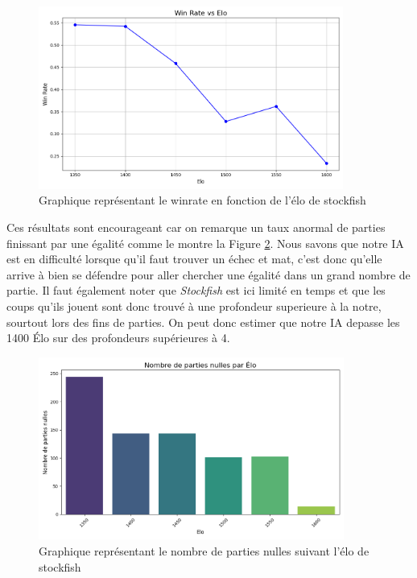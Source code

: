 \documentclass{article}
\begin{document}
\begin{figure}[h]
    \centering
    \includegraphics[width=\textwidth,height=6.0cm,keepaspectratio]{winRateCmp.png}
    \caption{Graphique représentant le winrate en fonction de l'élo de stockfish}
    \label{winRateCmp}
\end{figure}
\FloatBarrier

Ces résultats sont encourageant car on remarque un taux anormal de parties finissant par une égalité comme le montre la Figure \ref{drawCountCmp}. Nous savons que notre IA
est en difficulté lorsque qu'il faut trouver un échec et mat, c'est donc qu'elle arrive à bien se défendre pour aller chercher une égalité
dans un grand nombre de partie. Il faut également noter que \textit{Stockfish} est ici limité en temps et que les coups qu'ils jouent sont donc trouvé à une profondeur superieure à la notre,
sourtout lors des fins de parties. On peut donc estimer que notre IA depasse les 1400 Élo sur des profondeurs supérieures à 4.

\begin{figure}[h]
    \centering
    \includegraphics[width=\textwidth,height=6.0cm,keepaspectratio]{drawRate.png}
    \caption{Graphique représentant le nombre de parties nulles suivant l'élo de stockfish}
    \label{drawCountCmp}
\end{figure}
\FloatBarrier
\end{document}
